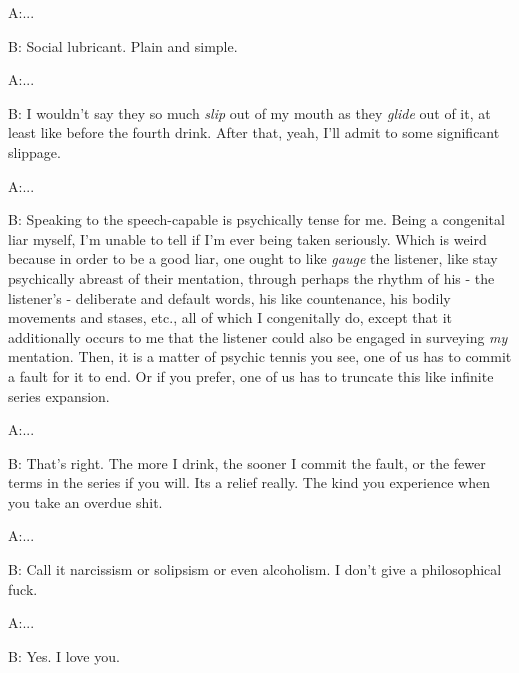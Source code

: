 \documentclass{article}
\begin{document}
\newline

A:...

B: Social lubricant. Plain and simple.
\newline

A:...

B: I wouldn't say they so much \textit{slip} out of my mouth as they
\textit{glide} out of it, at least like before the fourth drink. After
that, yeah, I'll admit to some significant slippage. \newline

A:...

B: Speaking to the speech-capable is psychically tense for me. Being
a congenital liar myself, I'm unable to tell if I'm ever being taken
seriously. Which is weird because in order to be a good liar, one ought
to like \textit{gauge} the listener, like stay psychically abreast of
their mentation, through perhaps the rhythm of his - the listener's
- deliberate and default words, his like countenance, his bodily
movements and stases, etc., all of which I congenitally do, except that
it additionally occurs to me that the listener could also be engaged in
surveying \textit{my} mentation. Then, it is a matter of psychic tennis
you see, one of us has to commit a fault for it to end. Or if you
prefer, one of us has to truncate this like infinite series expansion. 
\newline

A:...

B: That's right. The more I drink, the sooner I commit the fault, or the
fewer terms in the series if you will. Its a relief really. The kind
you experience when you take an overdue shit.
\newline

A:...

B: Call it narcissism or solipsism or even alcoholism. I don't give
a philosophical fuck.
\newline

A:...

B: Yes. I love you.
\newline
\end{document}

